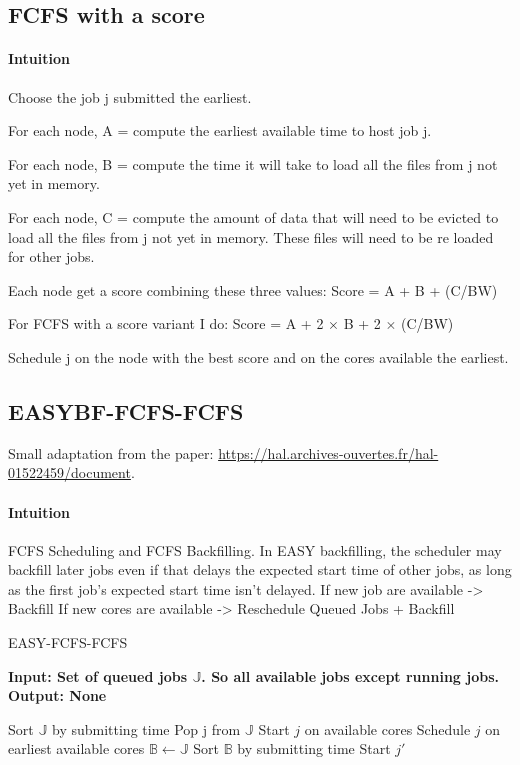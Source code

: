 \documentclass[a4paper]{article}
\newcommand{\jobset}{\ensuremath{\mathbb{J}}\xspace}
\begin{document}
\subsection{FCFS with a score}
\paragraph{Intuition}
Choose the job j submitted the earliest.

For each node, A = compute the earliest available time to host job j.

For each node, B = compute the time it will take to load all the files from j not yet in memory.

For each node, C = compute the amount of data that will need to be evicted to load all the files from j not yet in memory. These files will need to be re loaded for other jobs.

Each node get a score combining these three values: Score = A + B + (C/BW)

For FCFS with a score variant I do: Score = A + 2 $\times$ B + 2 $\times$ (C/BW)

Schedule j on the node with the best score and on the cores available the earliest.

\subsection{EASYBF-FCFS-FCFS}
Small adaptation from the paper: \url{https://hal.archives-ouvertes.fr/hal-01522459/document}.
\paragraph{Intuition}
FCFS Scheduling and FCFS Backfilling.
In EASY backfilling, the scheduler may backfill later jobs even if that delays the expected start time of other jobs, as long as the first job's expected start time isn't delayed. 
If new job are available -> Backfill
If new cores are available -> Reschedule Queued Jobs + Backfill
\begin{algorithm}[H]
\caption{EASY-FCFS-FCFS}
\hspace*{\algorithmicindent} \textbf{Input: Set of queued jobs $\jobset$. So all available jobs except running jobs.} \\
\hspace*{\algorithmicindent} \textbf{Output: None}
\begin{algorithmic}[1]
\State Sort $\jobset$ by submitting time
\State Pop j from $\jobset$
	\State Start $j$ on available cores
\Else
	\State Schedule $j$ on earliest available cores 
	\State $\mathbb{B} \gets \jobset$
	\State Sort $\mathbb{B}$ by submitting time 
		 
			\State Start $j'$
		\EndIf
	\EndFor
\EndIf		
\end{algorithmic}
\end{algorithm}
\end{document}
